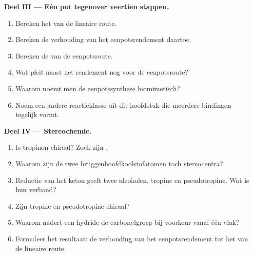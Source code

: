 \begin{problem}
\medskip\noindent\textbf{Deel III --- Eén pot tegenover veertien stappen.}
\begin{enumerate}[resume]
  \item Bereken het  van de lineaire route.
  \item Bereken de verhouding van het eenpotsrendement daartoe.
  \item Bereken de  van de eenpotsroute.
  \item Wat pleit naast het rendement nog voor de eenpotsroute?
  \item Waarom noemt men de eenpotssynthese biomimetisch?
  \item Noem een andere reactieklasse uit dit hoofdstuk die meerdere
        bindingen tegelijk vormt.
\end{enumerate}

\medskip\noindent\textbf{Deel IV --- Stereochemie.}
\begin{enumerate}[resume]
  \item Is tropinon chiraal? Zoek zijn .
  \item Waarom zijn de twee bruggenhoofdkoolstofatomen toch stereocentra?
  \item Reductie van het keton geeft twee alcoholen, tropine en
        pseudotropine. Wat is hun verband?
  \item Zijn tropine en pseudotropine chiraal?
  \item Waarom nadert een hydride de carbonylgroep bij voorkeur vanaf één
        vlak?
  \item Formuleer het resultaat: de verhouding van het eenpotsrendement
        tot het  van de lineaire route.
\end{enumerate}
\end{problem}
